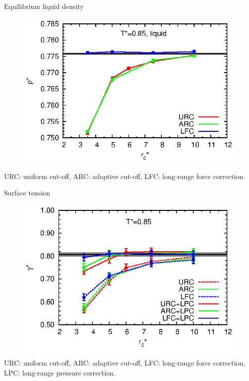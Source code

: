 \documentclass{beamer}
\begin{document}
\begin{frame}{Equilibrium liquid density}
  \begin{figure}
    \centering
    \includegraphics[]{figs/converge.new/t0p85-liquid.eps} 
  \end{figure}
  URC: uniform cut-off, ARC: adaptive cut-off, LFC: long-range force correction.
\end{frame}


\begin{frame}{Surface tension}
  \begin{figure}
    \centering
    \includegraphics[]{figs/converge.new/tension-t0p85.eps} 
  \end{figure}
  URC: uniform cut-off, ARC: adaptive cut-off, LFC: long-range force correction,
  LPC: long-range pressure correction.
\end{frame}
\end{document}
